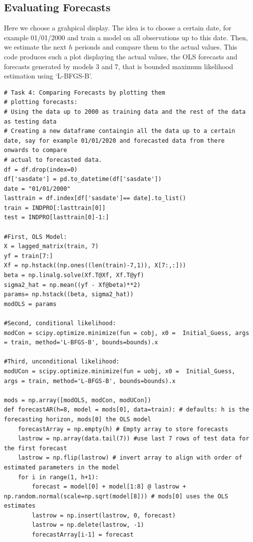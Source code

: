 \documentclass{article}
\begin{document}
\subsection{Evaluating Forecasts}
Here we choose a grahpical display. 
The idea is to choose a certain date, for example 01/01/2000 and train a model on all observations up to this date.
Then, we estimate the next $h$ perionds and compare them to the actual values.
This code produces such a plot displaying the actual values, the OLS forecasts and forecasts generated by models 3 and 7, that is bounded maximum likelihood estimation using `L-BFGS-B'.
\begin{verbatim}
# Task 4: Comparing Forecasts by plotting them
# plotting forecasts:
# Using the data up to 2000 as training data and the rest of the data as testing data
# Creating a new dataframe containgin all the data up to a certain date, say for example 01/01/2020 and forecasted data from there onwards to compare
# actual to forecasted data.
df = df.drop(index=0)
df['sasdate'] = pd.to_datetime(df['sasdate'])
date = "01/01/2000"
lasttrain = df.index[df['sasdate']== date].to_list() 
train = INDPRO[:lasttrain[0]]
test = INDPRO[lasttrain[0]-1:]

#First, OLS Model:
X = lagged_matrix(train, 7)
yf = train[7:]
Xf = np.hstack((np.ones((len(train)-7,1)), X[7:,:]))
beta = np.linalg.solve(Xf.T@Xf, Xf.T@yf)
sigma2_hat = np.mean((yf - Xf@beta)**2)
params= np.hstack((beta, sigma2_hat))
modOLS = params

#Second, conditional likelihood:
modCon = scipy.optimize.minimize(fun = cobj, x0 =  Initial_Guess, args = train, method='L-BFGS-B', bounds=bounds).x

#Third, unconditional likelihood:
modUCon = scipy.optimize.minimize(fun = uobj, x0 =  Initial_Guess, args = train, method='L-BFGS-B', bounds=bounds).x

mods = np.array([modOLS, modCon, modUCon])
def forecastAR(h=8, model = mods[0], data=train): # defaults: h is the forecasting horizon, mods[0] the OLS model
    forecastArray = np.empty(h) # Empty array to store forecasts
    lastrow = np.array(data.tail(7)) #use last 7 rows of test data for the first forecast
    lastrow = np.flip(lastrow) # invert array to align with order of estimated parameters in the model
    for i in range(1, h+1):
        forecast = model[0] + model[1:8] @ lastrow + np.random.normal(scale=np.sqrt(model[8])) # mods[0] uses the OLS estimates
        lastrow = np.insert(lastrow, 0, forecast)
        lastrow = np.delete(lastrow, -1)
        forecastArray[i-1] = forecast


\end{verbatim}
\end{document}
